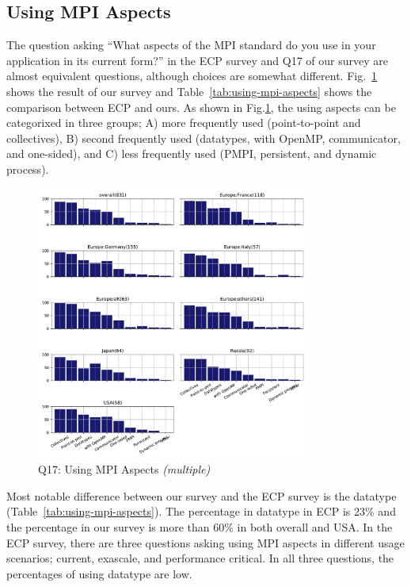 \documentclass[conference,10pt,letterpaper]{IEEEtran}
\begin{document}
\subsection{Using MPI Aspects}

The question asking ``What aspects of the MPI standard do you use in
your application in its current form?'' in the ECP survey and Q17 of
our survey are almost equivalent
questions, although choices are somewhat
different. Fig.~\ref{fig:using-mpi-aspects} shows the result of our 
survey and Table~\ref{tab:using-mpi-aspects} shows the comparison
between ECP and ours. As shown in Fig.\ref{fig:using-mpi-aspects}, the
using aspects can be categorixed in three groups; A) more frequently
used (point-to-point and collectives), B) second frequently used
(datatypes, with OpenMP, communicator, and one-sided), and C) less
frequently used (PMPI, persistent, and dynamic process).

\begin{figure}[htb]
\begin{center}
\includegraphics[width=9cm]{Figs/Q17.pdf}
\caption{Q17: Using MPI Aspects {\it(multiple)}}
\label{fig:using-mpi-aspects}
\end{center}
\end{figure}

Most notable difference between our survey and the ECP survey is the
datatype (Table~\ref{tab:using-mpi-aspects}). The percentage in
datatype in ECP is 23\% and the percentage in our survey is more
than 60\% in both overall and USA. In the ECP survey, there are three
questions asking using MPI aspects in different usage scenarios; current,
exascale, and performance critical. In all three questions, the
percentages of using datatype are low.
\end{document}
